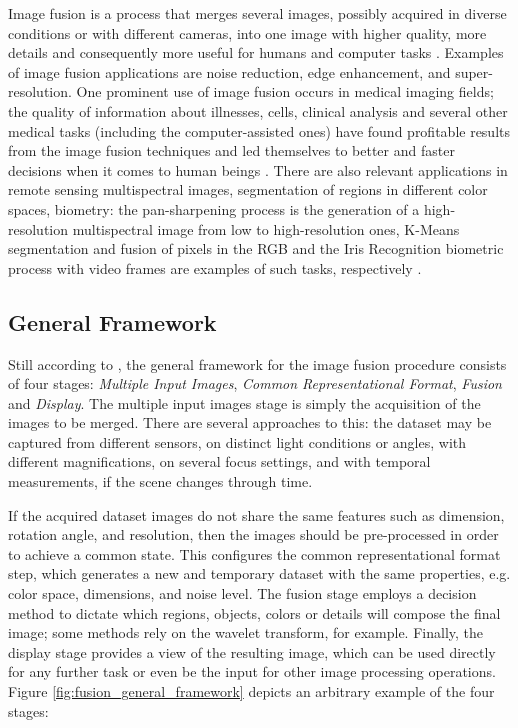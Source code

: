 Image fusion is a process that merges several images, possibly acquired in diverse conditions or with different cameras, into one image with higher quality, more details and consequently more useful for humans and computer tasks \cite{mitchell2010image}. Examples of image fusion applications are noise reduction, edge enhancement, and super-resolution. One prominent use of image fusion occurs in medical imaging fields; the quality of information about illnesses, cells, clinical analysis and several other medical tasks (including the computer-assisted ones) have found profitable results from the image fusion techniques and led themselves to better and faster decisions when it comes to human beings \cite{james2014medical}. There are also relevant applications in remote sensing multispectral images, segmentation of regions in different color spaces, biometry: the pan-sharpening process is the generation of a high-resolution multispectral image from low to high-resolution ones, K-Means segmentation and fusion of pixels in the RGB and the Iris Recognition biometric process with video frames are examples of such tasks, respectively \cite{mitchell2010image}.

\subsection{General Framework}

Still according to , the general framework for the image fusion procedure consists of four stages: \emph{Multiple Input Images}, \emph{Common Representational Format}, \emph{Fusion} and \emph{Display}.
The multiple input images stage is simply the acquisition of the images to be merged. There are several approaches to this: the dataset may be captured from different sensors, on distinct light conditions or angles, with different magnifications, on several focus settings, and with temporal measurements, if the scene changes through time.

If the acquired dataset images do not share the same features such as dimension, rotation angle, and resolution, then the images should be pre-processed in order to achieve a common state. This configures the common representational format step, which generates a new and temporary dataset with the same properties, e.g. color space, dimensions, and noise level. The fusion stage employs a decision method to dictate which regions, objects, colors or details will compose the final image; some methods rely on the wavelet transform, for example. Finally, the display stage provides a view of the resulting image, which can be used directly for any further task or even be the input for other image processing operations. Figure \ref{fig:fusion_general_framework} depicts an arbitrary example of the four stages:

